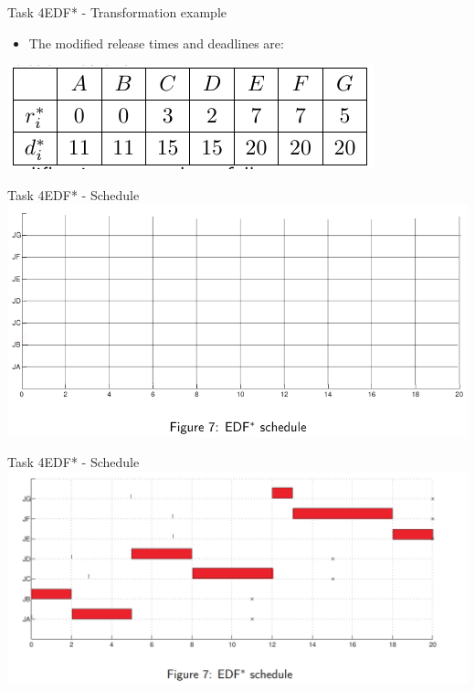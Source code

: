 \begin{frame}{Task 4}{EDF* - Transformation example}
  \begin{itemize}
    \item The modified \alert{release times} and \alert{deadlines} are:
  \end{itemize}
  \centering
 \includegraphics[height=0.2\paperheight]{./figures/4_tab.png}
\end{frame}

\begin{frame}{Task 4}{EDF* - Schedule}
    \includegraphics[width = 0.9\linewidth]{figures/EDF-star-schedule.png}
\end{frame}

\begin{frame}{Task 4}{EDF* - Schedule}
    \includegraphics[width = \linewidth]{figures/edf-star-schedule-2.PNG}
\end{frame}
